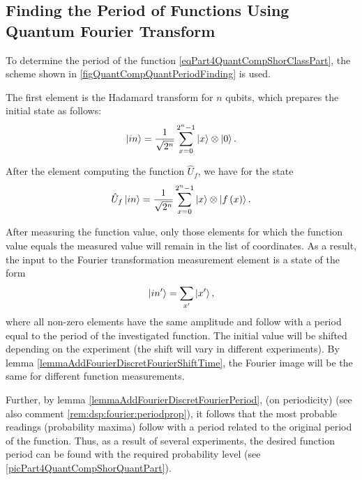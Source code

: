 \subsection{Finding the Period of Functions Using Quantum Fourier Transform}

To determine the period of the function \eqref{eqPart4QuantCompShorClassPart}, the scheme shown in \autoref{figQuantCompQuantPeriodFinding} is used.



The first element is the Hadamard transform for $n$ qubits,  which prepares the initial state as follows:
\begin{equation}
\ket{in} = \frac{1}{\sqrt{2^n}}\sum_{x=0}^{2^n - 1} \ket{x} \otimes \ket{0}.
\nonumber
\end{equation}

After the element computing the function $\hat{U}_f$, we have for the state
\begin{equation}
\hat{U}_f\ket{in} = \frac{1}{\sqrt{2^n}}\sum_{x=0}^{2^n - 1} \ket{x} \otimes \left|f\left(x\right)\right>.
\nonumber
\end{equation}



After measuring the function value, only those elements for which the function value equals the measured value will remain in the list of coordinates. As a result, the input to the Fourier transformation measurement element is a state of the form
\begin{equation}
\ket{in'} = \sum_{x'} \ket{x'},
\nonumber
\end{equation}
where all non-zero elements have the same amplitude and follow with a period equal to the period of the investigated function. The initial value will be shifted depending on the experiment (the shift will vary in different experiments). By lemma \ref{lemmaAddFourierDiscretFourierShiftTime}, the Fourier image will be the same for different function measurements.

Further, by lemma \ref{lemmaAddFourierDiscretFourierPeriod}, (on periodicity) (see also comment \ref{rem:dsp:fourier:periodprop}), it follows that the most probable readings (probability maxima) follow with a period related to the original period of the function. Thus, as a result of several experiments, the desired function period can be found with the required probability level (see \autoref{picPart4QuantCompShorQuantPart}).


